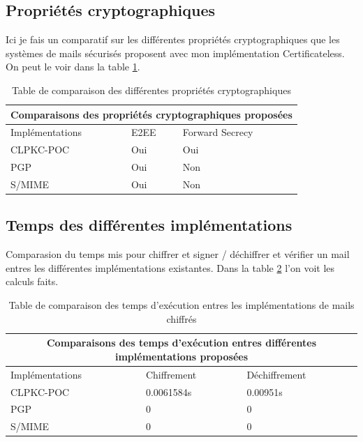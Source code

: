 \subsection{Propriétés cryptographiques}
Ici je fais un comparatif sur les différentes propriétés cryptographiques que les systèmes de mails sécurisés proposent avec mon implémentation Certificateless. On peut le voir dans la table \ref{table:comparisonProperties}.
\begin{table}[h!]
	\centering
	\begin{tabular}{ |p{3cm}||p{3cm}|p{3cm}| }
		\hline
		\multicolumn{3}{|c|}{Comparaisons des propriétés cryptographiques proposées} \\
		\hline
		Implémentations & E2EE & Forward Secrecy\\
		\hline
		CLPKC-POC   & Oui & Oui\\
		PGP & Oui & Non\\
		S/MIME & Oui & Non\\
		\hline
	\end{tabular}
	\caption{Table de comparaison des différentes propriétés cryptographiques }
	\label{table:comparisonProperties}
\end{table}
\subsection{Temps des différentes implémentations}
Comparasion du temps mis pour chiffrer et signer / déchiffrer et vérifier un mail entres les différentes implémentations existantes. Dans la table \ref{table:comparisonTime} l'on voit les calculs faits.
\begin{table}[h!]
	\centering
	\begin{tabular}{ |p{3cm}||p{3cm}|p{3cm}| }
		\hline
		\multicolumn{3}{|c|}{Comparaisons des temps d'exécution entres différentes implémentations proposées} \\
		\hline
		Implémentations & Chiffrement & Déchiffrement\\
		\hline
		CLPKC-POC   & 0.0061584s & 0.00951s\\
		PGP & 0 & 0\\
		S/MIME & 0 & 0\\
		\hline
	\end{tabular}
	\caption{Table de comparaison des temps d'exécution entres les implémentations de mails chiffrés}
	\label{table:comparisonTime}
\end{table}
